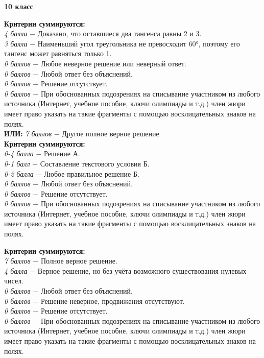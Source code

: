 \centerline{\bf \Huge 10 класс}

 \textbf{Критерии суммируются:} \\
\textit{4 балла} $-$ Доказано, что оставшиеся два тангенса равны 2 и 3.\\
\textit{3 балла} $-$ Наименьший угол треугольника не превосходит 60°, 
поэтому его тангенс может равняться только 1.\\
\textit{0 баллов} $-$ Любое неверное решение или неверный ответ.\\
\textit{0 баллов} $-$ Любой ответ без объяснений.\\
\textit{0 баллов} $-$ Решение отсутствует.\\
\textit{0 баллов} $-$ При обоснованных подозрениях на списывание участником из любого источника (Интернет, учебное пособие, ключи олимпиады и т.д.) член жюри имеет право указать на такие фрагменты с помощью восклицательных знаков на полях. \\

\textbf{ИЛИ:}
\textit{7 баллов} $-$ Другое полное верное решение.\\

 \textbf{Критерии суммируются:} \\
\textit{0-4 балла} $-$ Решение А.\\
\textit{0-1 балл} $-$ Составление текстового условия Б.\\
\textit{0-2 балла} $-$ Любое правильное решение Б.\\
\textit{0 баллов} $-$ Любой ответ без объяснений.\\
\textit{0 баллов} $-$ Решение отсутствует.\\
\textit{0 баллов} $-$ При обоснованных подозрениях на списывание участником из любого источника (Интернет, учебное пособие, ключи олимпиады и т.д.) член жюри имеет право указать на такие фрагменты с помощью восклицательных знаков на полях. \\

\newpage

 \textbf{Критерии суммируются:} \\
\textit{7 баллов} $-$ Полное верное решение.\\
\textit{4 балла} $-$ Верное решение, но без учёта возможного существования нулевых чисел.\\
\textit{0 баллов} $-$ Любой ответ без объяснений.\\
\textit{0 баллов} $-$ Решение неверное, продвижения отсутствуют.\\
\textit{0 баллов} $-$ Решение отсутствует.\\
\textit{0 баллов} $-$ При обоснованных подозрениях на списывание участником из любого источника (Интернет, учебное пособие, ключи олимпиады и т.д.) член жюри имеет право указать на такие фрагменты с помощью восклицательных знаков на полях. \\



